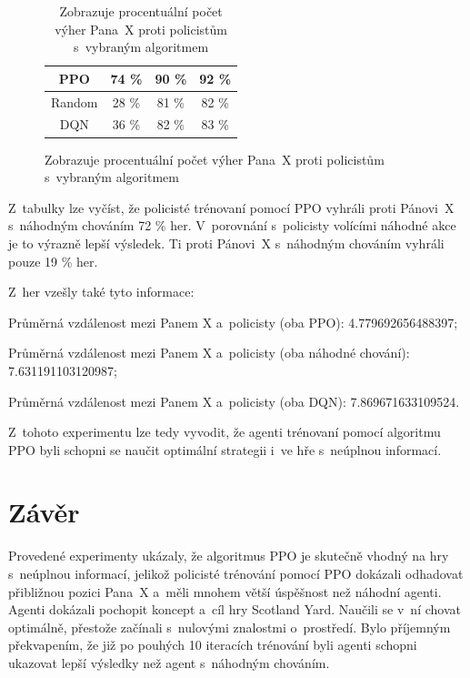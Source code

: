 \begin{figure}[H]
\begin{minipage}{.48\textwidth}
\begin{table}[H]
\begin{tabular}{@{} c|c|c|c @{}}
      \hline
      PPO                                    & 74 \% & 90 \% & 92 \% \\ \hline
      Random                                    & 28 \% & 81 \% & 82 \% \\ \hline
      DQN                                    & 36 \% & 82 \% & 83 \% \\ \hline
      \end{tabular}
      \caption{Zobrazuje procentuální počet výher Pana~X proti policistům s~vybraným algoritmem}
      \label{tab:train_experiment_mrx_wins}
    \end{table}
  \end{minipage}
  \end{figure}

Z~tabulky lze vyčíst, že policisté trénovaní pomocí PPO vyhráli proti Pánovi~X s~náhodným chováním 72 \% her.
V~porovnání s~policisty volícími náhodné akce je to výrazně lepší výsledek.
Ti proti Pánovi~X s~náhodným chováním vyhráli pouze 19 \% her.

Z~her vzešly také tyto informace:
\begin{myitemize}
  \item Průměrná vzdálenost mezi Panem X a~policisty (oba PPO): 4.779692656488397;
  \item Průměrná vzdálenost mezi Panem X a~policisty (oba náhodné chování): 7.631191103120987;
  \item Průměrná vzdálenost mezi Panem X a~policisty (oba DQN): 7.869671633109524.
\end{myitemize}

Z~tohoto experimentu lze tedy vyvodit, že agenti trénovaní pomocí algoritmu PPO byli schopni se naučit optimální strategii i~ve hře s~neúplnou informací.

\chapter{Závěr}
\label{ch:zaver}

Provedené experimenty ukázaly, že algoritmus PPO je skutečně vhodný na hry s~neúplnou informací, jelikož policisté trénování pomocí PPO dokázali odhadovat přibližnou pozici Pana~X a~měli mnohem větší úspěšnost než náhodní agenti.
Agenti dokázali pochopit koncept a~cíl hry Scotland Yard.
Naučili se v~ní chovat optimálně, přestože začínali s~nulovými znalostmi o~prostředí.
Bylo příjemným překvapením, že již po pouhých 10 iteracích trénování byli agenti schopni ukazovat lepší výsledky než agent s~náhodným chováním.

